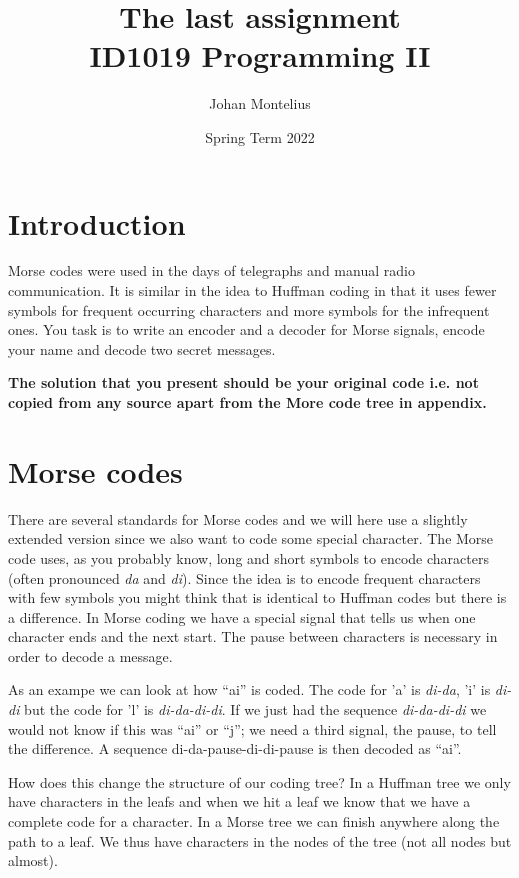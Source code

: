 \documentclass[a4paper,11pt]{article}
\begin{document}
\title{
    \textbf{The last assignment}\\
    \large{ID1019 Programming II}
}
\author{Johan Montelius}
\date{Spring Term 2022}
\maketitle
{}


\section*{Introduction}

Morse codes were used in the days of telegraphs and manual radio
communication. It is similar in the idea to Huffman coding in that it
uses fewer symbols for frequent occurring characters and more symbols
for the infrequent ones. You task is to write an encoder and a decoder
for Morse signals, encode your name and decode two secret messages.

{\bf The solution that you present should be your original code i.e. not
  copied from any source apart from the More code tree in appendix. }

\section*{Morse codes}

There are several standards for Morse codes and we will here use a
slightly extended version since we also want to code some special
character. The Morse code uses, as you probably know, long and short
symbols to encode characters (often pronounced {\em da} and {\em di}). Since
the idea is to encode frequent characters with few symbols you might
think that is identical to Huffman codes but there is a difference. In
Morse coding we have a special signal that tells us when one character
ends and the next start. The pause between characters is necessary in
order to decode a message.

As an exampe we can look at how ``ai'' is coded. The code for 'a' is
{\em di-da}, 'i' is {\em di-di} but the code for 'l' is {\em
  di-da-di-di}.  If we just had the sequence {\em di-da-di-di} we
would not know if this was ``ai'' or ``j''; we need a third signal,
the pause, to tell the difference. A sequence
{di-da-pause-di-di-pause} is then decoded as ``ai''.

How does this change the structure of our coding tree? In a Huffman
tree we only have characters in the leafs and when we hit a leaf we
know that we have a complete code for a character. In a Morse tree we
can finish anywhere along the path to a leaf. We thus have characters
in the nodes of the tree (not all nodes but almost).
\end{document}
